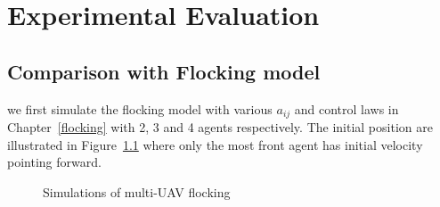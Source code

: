 \chapter{Experimental Evaluation}\label{experiment}

\section{Comparison with Flocking model}

we first simulate the flocking model with various $a_{ij}$ and control laws in Chapter~\ref{flocking} with 2, 3 and 4 agents respectively. The initial position are illustrated in Figure~\ref{fig:simulate_flocking} where only the most front agent has initial velocity pointing forward.
\begin{figure}[htb]
	\centering
	\caption{Simulations of multi-UAV flocking}\label{fig:simulate_flocking}
\end{figure}
